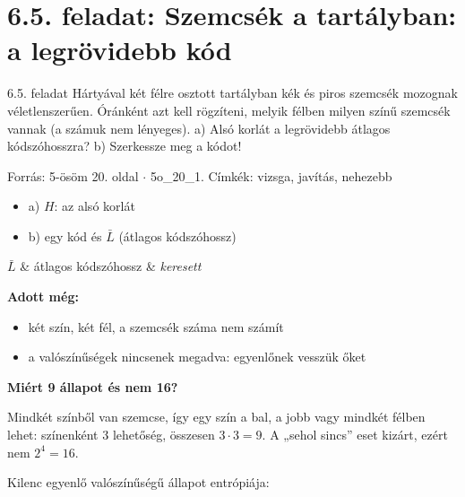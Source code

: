 \section{\texorpdfstring{6.5. feladat: Szemcsék a tartályban: a legrövidebb kód}{6.5. feladat: Szemcsék a tartályban: a legrövidebb kód}}\label{o6_05}
\setcounter{lepes}{0}
\begin{feladat}{6.5. feladat}
Hártyával két félre osztott tartályban kék és piros szemcsék mozognak véletlenszerűen. Óránként azt kell rögzíteni, melyik félben milyen színű szemcsék vannak (a számuk nem lényeges). a) Alsó korlát a legrövidebb átlagos kódszóhosszra? b) Szerkessze meg a kódot!

{\footnotesize\sffamily Forrás: 5-ösöm 20. oldal $\cdot$ 5o\_20\_1. Címkék: vizsga, javítás, nehezebb}
\end{feladat}
\begin{keresunk}
\begin{itemize}
\item a) $H$: az alsó korlát
\item b) egy kód és $\bar L$ (átlagos kódszóhossz)
\end{itemize}
\end{keresunk}
\begin{jeloles}
\begin{jeltabla}
$\bar L$ & átlagos kódszóhossz & \emph{keresett}\\
\end{jeltabla}
\par\smallskip\textbf{Adott még:}
\begin{itemize}
\item két szín, két fél, a szemcsék száma nem számít
\item a valószínűségek nincsenek megadva: egyenlőnek vesszük őket
\end{itemize}
\end{jeloles}
\begin{elmelet}
\textbf{Miért 9 állapot és nem 16?}\par Mindkét színből van szemcse, így egy szín a bal, a jobb vagy mindkét félben lehet: színenként 3 lehetőség, összesen $3\cdot3=9$. A „sehol sincs” eset kizárt, ezért nem $2^4=16$.
\end{elmelet}

Kilenc egyenlő valószínűségű állapot entrópiája:

\begin{center}\end{center}

